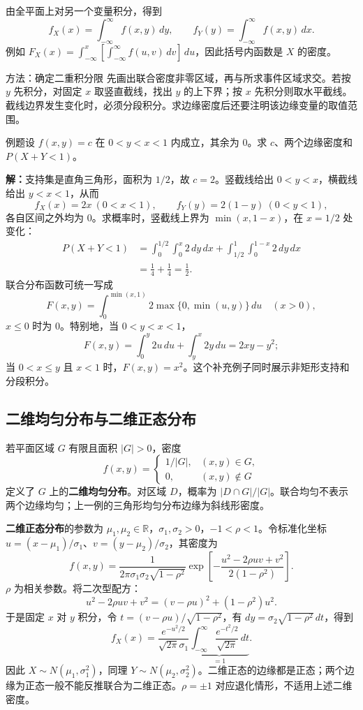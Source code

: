 \documentclass[UTF8,fontset=none,zihao=-4,a4paper]{ctexart}
\newcommand{\term}[1]{\textbf{#1}}
\newcommand{\example}[1]{\begin{infobox}{例题}#1\end{infobox}}
\newcommand{\solution}{\par\noindent\textbf{解：}}
\begin{document}
由全平面上对另一个变量积分，得到
\[
f_X(x)=\int_{-\infty}^{\infty}f(x,y)\,dy,\qquad
f_Y(y)=\int_{-\infty}^{\infty}f(x,y)\,dx.
\]
例如 $F_X(x)=\int_{-\infty}^x[\int_{-\infty}^{\infty}f(u,v)\,dv]\,du$，因此括号内函数是 $X$ 的密度。
\begin{infobox}{方法：确定二重积分限}
先画出联合密度非零区域，再与所求事件区域求交。若按 $y$ 先积分，对固定 $x$ 取竖直截线，找出 $y$ 的上下界；按 $x$ 先积分则取水平截线。截线边界发生变化时，必须分段积分。求边缘密度后还要注明该边缘变量的取值范围。
\end{infobox}
\example{设 $f(x,y)=c$ 在 $0<y<x<1$ 内成立，其余为 $0$。求 $c$、两个边缘密度和 $P(X+Y<1)$。}
\solution 支持集是直角三角形，面积为 $1/2$，故 $c=2$。竖截线给出 $0<y<x$，横截线给出 $y<x<1$，从而
\[
f_X(x)=2x\ (0<x<1),\qquad f_Y(y)=2(1-y)\ (0<y<1),
\]
各自区间之外均为 $0$。求概率时，竖截线上界为 $\min(x,1-x)$，在 $x=1/2$ 处变化：
\begin{align*}
P(X+Y<1)
&=\int_0^{1/2}\int_0^x2\,dy\,dx
+\int_{1/2}^{1}\int_0^{1-x}2\,dy\,dx\\
&=\frac14+\frac14=\frac12.
\end{align*}
联合分布函数可统一写成
\[
F(x,y)=\int_0^{\min(x,1)}2\max\{0,\min(u,y)\}\,du\quad(x>0),
\]
$x\le0$ 时为 $0$。特别地，当 $0<y<x<1$，
\[
F(x,y)=\int_0^y2u\,du+\int_y^x2y\,du=2xy-y^2;
\]
当 $0<x\le y$ 且 $x<1$ 时，$F(x,y)=x^2$。这个补充例子同时展示非矩形支持和分段积分。
\subsection{二维均匀分布与二维正态分布}
若平面区域 $G$ 有限且面积 $|G|>0$，密度
\[
f(x,y)=\begin{cases}1/|G|,&(x,y)\in G,\\0,&(x,y)\notin G\end{cases}
\]
定义了 $G$ 上的\term{二维均匀分布}。对区域 $D$，概率为 $|D\cap G|/|G|$。联合均匀不表示两个边缘均匀；上一例的三角形均匀分布边缘为斜线形密度。

\term{二维正态分布}的参数为 $\mu_1,\mu_2\in\mathbb R$，$\sigma_1,\sigma_2>0$，$-1<\rho<1$。令标准化坐标 $u=(x-\mu_1)/\sigma_1$、$v=(y-\mu_2)/\sigma_2$，其密度为
\[
f(x,y)=\frac1{2\pi\sigma_1\sigma_2\sqrt{1-\rho^2}}
\exp\left[-\frac{u^2-2\rho uv+v^2}{2(1-\rho^2)}\right].
\]
$\rho$ 为相关参数。将二次型配方：
\[
u^2-2\rho uv+v^2=(v-\rho u)^2+(1-\rho^2)u^2.
\]
于是固定 $x$ 对 $y$ 积分，令 $t=(v-\rho u)/\sqrt{1-\rho^2}$，有 $dy=\sigma_2\sqrt{1-\rho^2}\,dt$，得到
\[
f_X(x)=\frac{e^{-u^2/2}}{\sqrt{2\pi}\sigma_1}
\underbrace{\int_{-\infty}^{\infty}\frac{e^{-t^2/2}}{\sqrt{2\pi}}\,dt}_{=1}.
\]
因此 $X\sim N(\mu_1,\sigma_1^2)$，同理 $Y\sim N(\mu_2,\sigma_2^2)$。二维正态的边缘都是正态；两个边缘为正态一般不能反推联合为二维正态。$\rho=\pm1$ 对应退化情形，不适用上述二维密度。
\end{document}
